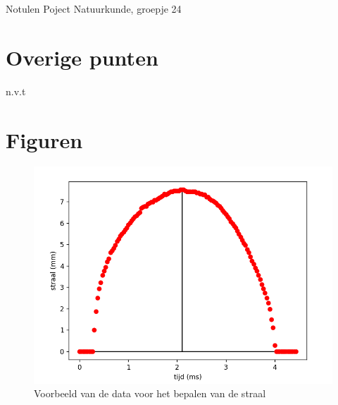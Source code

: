 \documentclass[11pt,a4paper]{article}
\begin{document}
\begin{Minutes}{Notulen Poject Natuurkunde, groepje 24}
\section{Overige punten}
n.v.t

\section{Figuren}
\begin{figure}[h]
    \centering
    \includegraphics[width=0.5\linewidth]{straalbepalen.png}
    \caption{Voorbeeld van de data voor het bepalen van de straal}
    \label{fig:straalbepalen}
\end{figure}

\end{Minutes}
\end{document}
